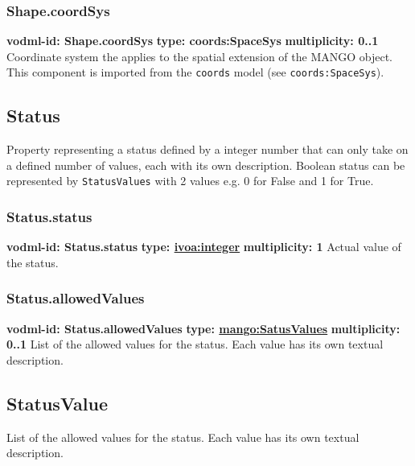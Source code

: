     \subsubsection{Shape.coordSys}
      \textbf{vodml-id: Shape.coordSys} \newline
      \textbf{type: coords:SpaceSys} \newline
      \textbf{multiplicity: 0..1} \newline 
      Coordinate system the applies to the spatial extension of the MANGO object. This component is imported from the \texttt{coords} model (see \texttt{coords:SpaceSys}).

  \subsection{Status}
  \label{sect:Status}
    Property representing a status defined by a integer number that can only take on a defined number of values, each with its own description. Boolean status can be represented by \texttt{StatusValues} with 2 values e.g. 0 for False and 1 for True.

    \subsubsection{Status.status}
      \textbf{vodml-id: Status.status} \newline
      \textbf{type: \hyperref[sect:ivoa]{ivoa:integer}} \newline
      \textbf{multiplicity: 1} \newline 
      Actual value of the status.

    \subsubsection{Status.allowedValues}
      \textbf{vodml-id: Status.allowedValues} \newline
      \textbf{type: \hyperref[sect:SatusValues]{mango:SatusValues}} \newline
      \textbf{multiplicity: 0..1} \newline 
      List of the allowed values for the status. Each value has its own textual description.

  \subsection{StatusValue}
  \label{sect:StatusValue}
    List of the allowed values for the status. Each value has its own textual description.

